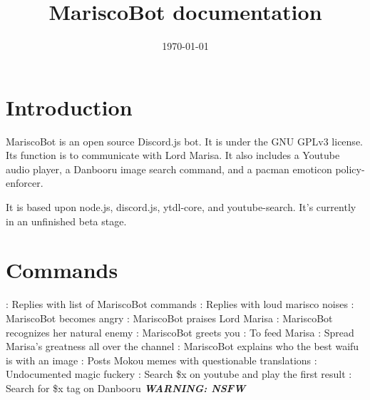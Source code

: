 \documentclass{article}
\begin{document}
\title{MariscoBot documentation}
\date{\today{}}
\maketitle{}
\tableofcontents
\newpage
\section{Introduction}
MariscoBot is an open source Discord.js bot. It is under the GNU GPLv3 license. Its function is to communicate with Lord Marisa. It also includes a Youtube audio player, a Danbooru image search command, and a pacman emoticon policy-enforcer.\

It is based upon node.js, discord.js, ytdl-core, and youtube-search. It's currently in an unfinished beta stage.\

\section{Commands}
\begin{flushleft}
\noindent{} : Replies with list of MariscoBot commands\newline
\noindent{} : Replies with loud marisco noises\newline
\noindent{} : MariscoBot becomes angry\newline
\noindent{} : MariscoBot praises Lord Marisa\newline
\noindent{} : MariscoBot recognizes her natural enemy\newline
\noindent{} : MariscoBot greets you\newline
\noindent{} : To feed Marisa\newline
\noindent{} : Spread Marisa's greatness all over the channel\newline
\noindent{} : MariscoBot explains who the best waifu is with an image\newline
\noindent{} : Posts Mokou memes with questionable translations\newline
\noindent{} : Undocumented magic fuckery\newline
\noindent{} : Search \$x on youtube and play the first result\newline
\noindent{} : Search for \$x tag on Danbooru \textbf{\emph{WARNING: NSFW}}\par
\end{flushleft}
\end{document}
